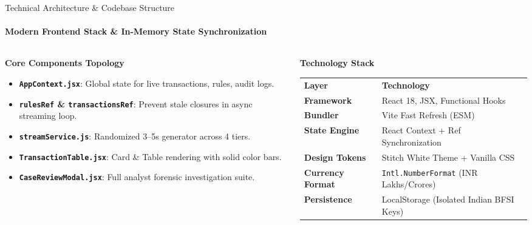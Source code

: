 \documentclass[aspectratio=169,10pt]{beamer}
\begin{document}
\begin{frame}{Technical Architecture \& Codebase Structure}
  \framesubtitle{Modern Frontend Stack \& In-Memory State Synchronization}
  \begin{columns}[t]
    \begin{column}{0.50\textwidth}
      \begin{block}{\textbf{Core Components Topology}}
        \begin{itemize}
          \item \textbf{\texttt{AppContext.jsx}}: Global state for live transactions, rules, audit logs.
          \item \textbf{\texttt{rulesRef} \& \texttt{transactionsRef}}: Prevent stale closures in async streaming loop.
          \item \textbf{\texttt{streamService.js}}: Randomized 3--5s generator across 4 tiers.
          \item \textbf{\texttt{TransactionTable.jsx}}: Card \& Table rendering with solid color bars.
          \item \textbf{\texttt{CaseReviewModal.jsx}}: Full analyst forensic investigation suite.
        \end{itemize}
      \end{block}
    \end{column}

    \begin{column}{0.48\textwidth}
      \begin{exampleblock}{\textbf{Technology Stack}}
        \scriptsize
        \begin{tabular}{ll}
          \toprule
          \textbf{Layer} & \textbf{Technology} \\
          \par\vspace{0.2em}\dotfill\par

          \textbf{Framework} & React 18, JSX, Functional Hooks \\
          \textbf{Bundler} & Vite Fast Refresh (ESM) \\
          \textbf{State Engine} & React Context + Ref Synchronization \\
          \textbf{Design Tokens} & Stitch White Theme + Vanilla CSS \\
          \textbf{Currency Format} & \texttt{Intl.NumberFormat} (INR Lakhs/Crores) \\
          \textbf{Persistence} & LocalStorage (Isolated Indian BFSI Keys) \\
          \bottomrule
        \end{tabular}
      \end{exampleblock}
    \end{column}
  \end{columns}
\end{frame}
\end{document}
